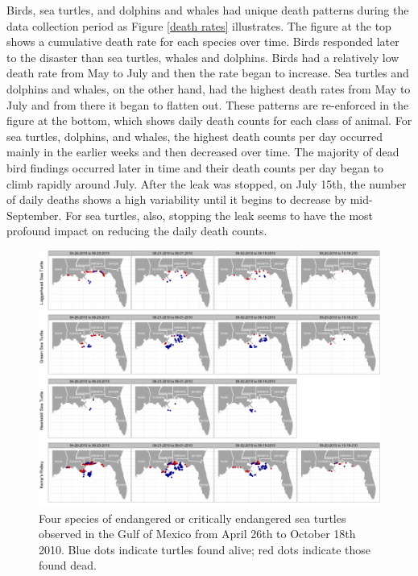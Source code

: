 \documentclass[authoryear,12pt]{elsarticle}
\begin{document}
Birds, sea turtles, and dolphins and whales had unique death patterns during the data collection period as Figure \ref{death rates}  illustrates. The figure at the top shows a cumulative death rate for each species over time. Birds responded later to the disaster than sea turtles, whales and dolphins. Birds had a relatively low death rate from May to July and then the rate began to increase. Sea turtles and dolphins and whales, on the other hand, had the highest death rates from May to July and from there it began to flatten out. 
These patterns are re-enforced in  the figure at the bottom, which shows daily death counts for each class of animal. For sea turtles, dolphins, and whales, the highest death counts per day occurred mainly in the earlier weeks and then decreased over time.  The majority of dead bird findings occurred later in time and their death counts per day began to climb rapidly around July. After the leak was stopped, on July 15th, the number of daily deaths shows a high variability until it begins to decrease by mid-September. For sea turtles, also, stopping the leak seems to have the most profound impact on reducing the daily death counts. 

\begin{figure}[htbp] %
   \centering
   \includegraphics[width=6in]{turtles.png} 
   \caption{Four species of endangered or critically endangered sea turtles observed in the Gulf of Mexico from April 26th to October 18th 2010.  Blue dots indicate turtles found alive; red dots indicate those found dead.}
   \label{turtles}
\end{figure}
\end{document}
